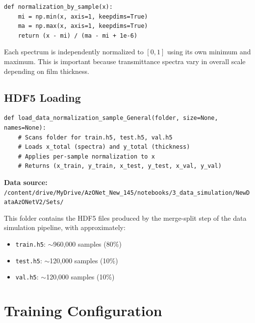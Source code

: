 \documentclass[11pt,a4paper]{article}
\begin{document}
\begin{lstlisting}
def normalization_by_sample(x):
    mi = np.min(x, axis=1, keepdims=True)
    ma = np.max(x, axis=1, keepdims=True)
    return (x - mi) / (ma - mi + 1e-6)
\end{lstlisting}

Each spectrum is independently normalized to $[0, 1]$ using its own minimum and maximum. This is important because transmittance spectra vary in overall scale depending on film thickness.

\subsection{HDF5 Loading}

\begin{lstlisting}
def load_data_normalization_sample_General(folder, size=None, names=None):
    # Scans folder for train.h5, test.h5, val.h5
    # Loads x_total (spectra) and y_total (thickness)
    # Applies per-sample normalization to x
    # Returns (x_train, y_train, x_test, y_test, x_val, y_val)
\end{lstlisting}

\textbf{Data source:} \texttt{/content/drive/MyDrive/AzONet\_New\_145/notebooks/3\_data\_simulation/NewDataAzONetV2/Sets/}

This folder contains the HDF5 files produced by the merge-split step of the data simulation pipeline, with approximately:

\begin{itemize}
    \item \texttt{train.h5}: $\sim$960,000 samples (80\%)
    \item \texttt{test.h5}: $\sim$120,000 samples (10\%)
    \item \texttt{val.h5}: $\sim$120,000 samples (10\%)
\end{itemize}

\section{Training Configuration}
\end{document}

